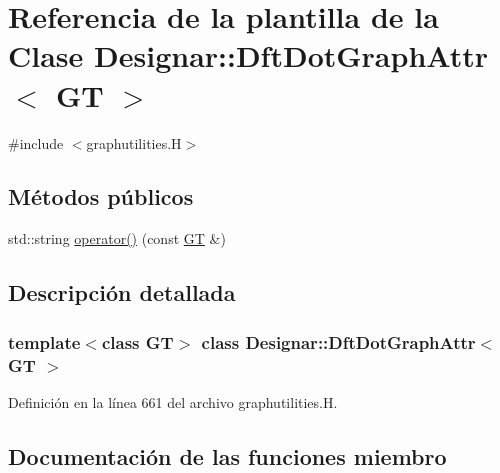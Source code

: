 \hypertarget{class_designar_1_1_dft_dot_graph_attr}{}\section{Referencia de la plantilla de la Clase Designar\+:\+:Dft\+Dot\+Graph\+Attr$<$ GT $>$}
\label{class_designar_1_1_dft_dot_graph_attr}


{\ttfamily \#include $<$graphutilities.\+H$>$}

\subsection*{Métodos públicos}
\begin{DoxyCompactItemize}
\item 
std\+::string \hyperlink{class_designar_1_1_dft_dot_graph_attr_ab543d70d47040459bf4284e5cf8106f5}{operator()} (const \hyperlink{demo-buildgraph_8_c_a3001c40d2c31ca87ed96cd7d1334a55e}{GT} \&)
\end{DoxyCompactItemize}


\subsection{Descripción detallada}
\subsubsection*{template$<$class GT$>$\newline
class Designar\+::\+Dft\+Dot\+Graph\+Attr$<$ G\+T $>$}



Definición en la línea 661 del archivo graphutilities.\+H.



\subsection{Documentación de las funciones miembro}
\mbox{\label{class_designar_1_1_dft_dot_graph_attr_ab543d70d47040459bf4284e5cf8106f5}} 
